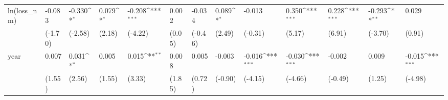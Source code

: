 \def\sym#1{\ifmmode^{#1}\else\(^{#1}\)\fi}
\begin{tabular}{p{1.5cm} p{1.7cm} p{1.7cm} p{1.7cm}  p{1.7cm} p{1.7cm} p{1.7cm} p{1.7cm} p{1.7cm}  p{1.7cm} p{1.7cm} p{1.7cm} p{1.7cm} }
\hline
ln(loss\_nm)     &   -0.083         &   -0.330\sym{*}  &    0.079\sym{*}  &   -0.208\sym{***}&    0.002         &   -0.034         &    0.089\sym{*}  &   -0.013         &    0.350\sym{***}&    0.228\sym{***}&   -0.293\sym{**} &    0.029         \\
                &  (-1.70)         &  (-2.58)         &   (2.18)         &  (-4.22)         &   (0.05)         &  (-0.46)         &   (2.49)         &  (-0.31)         &   (5.17)         &   (6.91)         &  (-3.70)         &   (0.91)         \\
year            &    0.007         &    0.031\sym{*}  &    0.005         &    0.015\sym{**} &    0.008         &    0.005         &   -0.003         &   -0.016\sym{***}&   -0.030\sym{***}&   -0.002         &    0.009         &   -0.015\sym{***}\\
                &   (1.55)         &   (2.56)         &   (1.55)         &   (3.33)         &   (1.85)         &   (0.72)         &  (-0.90)         &  (-4.15)         &  (-4.66)         &  (-0.49)         &   (1.25)         &  (-4.98)         \\
\end{tabular}
